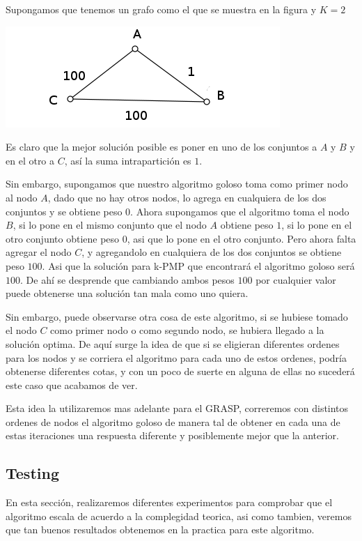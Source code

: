 Supongamos que tenemos un grafo como el que se muestra en la figura y $K = 2$

\includegraphics[scale=0.5]{Ej3/grafo.png}

Es claro que la mejor solución posible es poner en uno de los conjuntos a $A$ y $B$ y en el otro a $C$, así la suma intrapartición es $1$.

Sin embargo, supongamos que nuestro algoritmo goloso toma como primer nodo al nodo $A$, dado que no hay otros nodos, lo agrega en cualquiera de los dos conjuntos y se obtiene peso $0$. Ahora supongamos que el algoritmo toma el nodo $B$, si lo pone en el mismo conjunto que el nodo $A$ obtiene peso $1$, si lo pone en el otro conjunto obtiene peso $0$, asi que lo pone en el otro conjunto. Pero ahora falta agregar el nodo $C$, y agregandolo en cualquiera de los dos conjuntos se obtiene peso $100$. Asi que la solución para k-PMP que encontrará el algoritmo goloso será $100$.
De ahí se desprende que cambiando ambos pesos $100$ por cualquier valor puede obtenerse una solución tan mala como uno quiera.

Sin embargo, puede observarse otra cosa de este algoritmo, si se hubiese tomado el nodo $C$ como primer nodo o como segundo nodo, se hubiera llegado a la solución optima. De aquí surge la idea de que si se eligieran diferentes ordenes para los nodos y se corriera el algoritmo para cada uno de estos ordenes, podría obtenerse diferentes cotas, y con un poco de suerte en alguna de ellas no sucederá este caso que acabamos de ver.

Esta idea la utilizaremos mas adelante para el GRASP, correremos con distintos ordenes de nodos el algoritmo goloso de manera tal de obtener en cada una de estas iteraciones una respuesta diferente y posiblemente mejor que la anterior.

\subsection{Testing}

En esta sección, realizaremos diferentes experimentos para comprobar que el algoritmo escala de acuerdo a la complegidad teorica, asi como tambien, veremos que tan buenos resultados obtenemos en la practica para este algoritmo.

